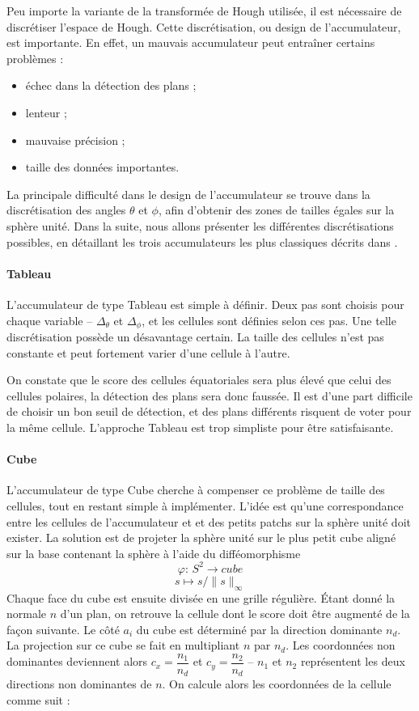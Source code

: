 \documentclass[12pt, twoside]{article}
\begin{document}
Peu importe la variante de la transformée de Hough utilisée, il est nécessaire de discrétiser l'espace de Hough. Cette discrétisation, ou design de l'accumulateur, est importante. En effet, un mauvais accumulateur peut entraîner certains problèmes :
\begin{itemize}
  \item échec dans la détection des plans ;
  \item lenteur ;
  \item mauvaise précision ;
  \item taille des données importantes.
\end{itemize}
La principale difficulté dans le design de l'accumulateur se trouve dans la discrétisation des angles $\theta$ et $\phi$, afin d'obtenir des zones de tailles égales sur la sphère unité. Dans la suite, nous allons présenter les différentes discrétisations possibles, en détaillant les trois accumulateurs les plus classiques décrits dans \cite{Hough2}.

\paragraph{Tableau}
L’accumulateur de type Tableau est simple à définir. Deux pas sont choisis pour chaque variable -- $\Delta_{\theta}$ et $\Delta_{\phi}$, et les cellules sont définies selon ces pas. Une telle discrétisation possède un désavantage certain. La taille des cellules n’est pas constante et peut fortement varier d’une cellule à l’autre.

On constate que le score des cellules équatoriales sera plus élevé que celui des cellules polaires, la détection des plans sera donc faussée. Il est d’une part difficile de choisir un bon seuil de détection, et des plans différents risquent de voter pour la même cellule. L’approche Tableau est trop simpliste pour être satisfaisante.

\paragraph{Cube}
L’accumulateur de type Cube cherche à compenser ce problème de taille des cellules, tout en restant simple à implémenter. L’idée est qu’une correspondance entre les cellules de l’accumulateur et et des petits patchs sur la sphère unité doit exister. La solution est de projeter la sphère unité sur le plus petit cube aligné sur la base contenant la sphère à l’aide du difféomorphisme
$$\varphi \text{: } S^2 \rightarrow cube$$
$$s \mapsto s/\lVert s\rVert_{\infty}$$
Chaque face du cube est ensuite divisée en une grille régulière. Étant donné la normale $n$ d’un plan, on retrouve la cellule dont le score doit être augmenté de la façon suivante. Le côté $a_i$ du cube est déterminé par la direction dominante $n_d$. La projection sur ce cube se fait en multipliant $n$ par $n_d$. Les coordonnées non dominantes deviennent alors $c_x =
\dfrac{n_1}{n_d}$ et $c_y = \dfrac{n_2}{n_d}$ -- $n_1$ et $n_2$ représentent les deux directions non dominantes de $n$. On calcule alors les coordonnées de la cellule comme suit :
\end{document}
